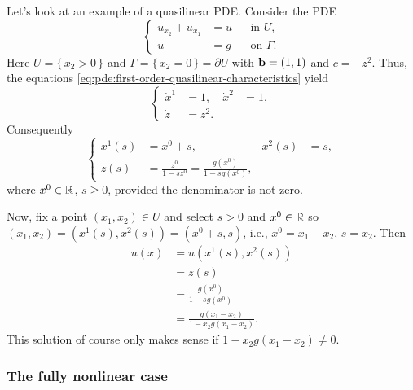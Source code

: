 \begin{example}
  Let's look at an example of a quasilinear PDE. Consider the PDE
  \[
    \tag{\(*\)}
    \left\{
      \begin{aligned}
        u_{x_2}+u_{x_1}&=u&&\text{in \(U\),}\\
        u&=g&&\text{on \(\Gamma\).}
      \end{aligned}
    \right.
  \]
  Here \(U=\{\,x_2>0\,\}\) and \(\Gamma=\{\,x_2=0\,\}=\partial U\) with
  \(\mathbf{b}=(1,1)\) and \(c=-z^2\). Thus, the equations
  \eqref{eq:pde:first-order-quasilinear-characteristics} yield
  \[
    \left\{
      \begin{aligned}
        \dot x^1&=1,&\dot x^2&=1,\\
        \dot z&=z^2.
      \end{aligned}
    \right.
  \]
  Consequently
  \[
    \left\{
      \begin{aligned}
        x^1(s)&=x^0+s,&x^2(s)&=s,\\
        z(s)&=\frac{z^0}{1-sz^0}=\frac{g(x^0)}{1-sg(x^0)},
      \end{aligned}
    \right.
  \]
  where \(x^0\in\mathbb{R}\), \(s\geq 0\), provided the denominator is not zero.

  Now, fix a point \((x_1,x_2)\in U\) and select \(s>0\) and \(x^0\in\mathbb{R}\)
  so \((x_1,x_2)=(x^1(s),x^2(s))=(x^0+s,s)\), i.e., \(x^0=x_1-x_2\),
  \(s=x_2\). Then
  \begin{align*}
    u(x)&=u(x^1(s),x^2(s))\\
        &=z(s)\\
        &=\frac{g(x^0)}{1-sg(x^0)}\\
        &=\frac{g(x_1-x_2)}{1-x_2g(x_1-x_2)}.
  \end{align*}
  This solution of course only makes sense if \(1-x_2g(x_1-x_2)\neq 0\).
\end{example}

\subsubsection{The fully nonlinear case}

